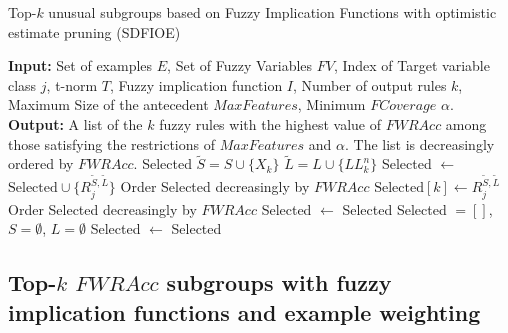 \begin{algorithm}[!htp]
	\caption{Top-$k$ unusual subgroups based on Fuzzy Implication Functions with optimistic estimate pruning (SDFIOE)}\label{alg:SDFIOE} 
	\begin{algorithmic}
		\State \textbf{Input:} Set of examples $E$, Set of Fuzzy Variables $FV$, Index of Target variable class $j$, t-norm $T$, Fuzzy implication function $I$, Number of output rules $k$, Maximum Size of the antecedent $MaxFeatures$, Minimum $FCoverage$ $\alpha$.
		\State \textbf{Output:} A list of the $k$ fuzzy rules with the highest value of $FWRAcc$ among those satisfying the restrictions of $MaxFeatures$ and $\alpha$. The list is decreasingly ordered by $FWRAcc$.
		\State
		\State \Return Selected
		\Else
		\State $\tilde{S}= S \cup \{X_{k}\}$
		\State $\tilde{L} = L \cup \{LL^n_{k}\}$
		\State Selected $ \leftarrow $ $\text{Selected} \cup \{R_{j}^{\tilde{S},\tilde{L}}\}$
		\State Order Selected decreasingly by $FWRAcc$
		\Else
		\State $\text{Selected}[k] \leftarrow R_{j}^{\tilde{S},\tilde{L}}$
		\State Order Selected decreasingly by $FWRAcc$
		\EndIf
		\State Selected $\leftarrow$ 
		\EndIf
		\EndIf
		\EndIf
		\EndFor
		\EndFor
		\State \Return Selected
		\EndIf
		\EndFunction
		\State
		\State Selected $= []$, $S = \emptyset$, $L = \emptyset$
		\State Selected $\leftarrow$ 
		\State \Return Selected
		\EndFunction
	\end{algorithmic}
\end{algorithm}

\subsection{Top-$k$ $FWRAcc$ subgroups with fuzzy implication functions and example weighting}

